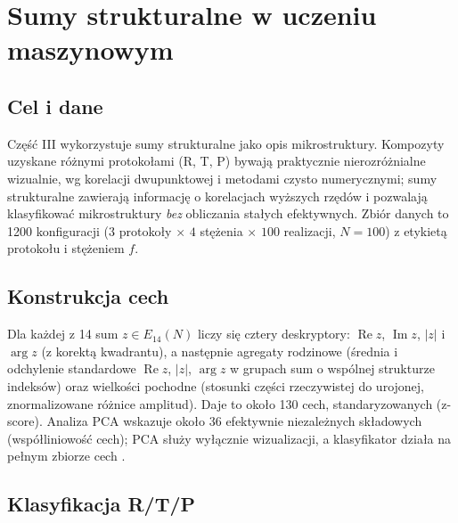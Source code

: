 \documentclass[12pt,a4paper,twoside,openright]{report}
\theoremstyle{definition}
\theoremstyle{remark}
\renewcommand{\Re}{\operatorname{Re}}
\renewcommand{\Im}{\operatorname{Im}}
\begin{document}
\chapter{Sumy strukturalne w uczeniu maszynowym}\label{sec:ml}

\section{Cel i dane}

Część III \cite{mityushev2025computationalpart3} wykorzystuje sumy strukturalne jako opis mikrostruktury. Kompozyty uzyskane różnymi protokołami (R, T, P) bywają praktycznie nierozróżnialne wizualnie, wg korelacji dwupunktowej i metodami czysto numerycznymi; sumy strukturalne zawierają informację o korelacjach wyższych rzędów i pozwalają klasyfikować mikrostruktury \emph{bez} obliczania stałych efektywnych. Zbiór danych to 1200 konfiguracji ($3$ protokoły $\times$ $4$ stężenia $\times$ $100$ realizacji, $N=100$) z etykietą protokołu i stężeniem $f$.

\section{Konstrukcja cech}

Dla każdej z 14 sum $z\in E_{14}(N)$ liczy się cztery deskryptory: $\Re z$, $\Im z$, $|z|$ i $\arg z$ (z korektą kwadrantu), a następnie agregaty rodzinowe (średnia i odchylenie standardowe $\Re z$, $|z|$, $\arg z$ w grupach sum o wspólnej strukturze indeksów) oraz wielkości pochodne (stosunki części rzeczywistej do urojonej, znormalizowane różnice amplitud). Daje to około 130 cech, standaryzowanych (z-score). Analiza PCA wskazuje około 36 efektywnie niezależnych składowych (współliniowość cech); PCA służy wyłącznie wizualizacji, a klasyfikator działa na pełnym zbiorze cech \cite{mityushev2025computationalpart3}.

\section{Klasyfikacja R/T/P}
\end{document}
